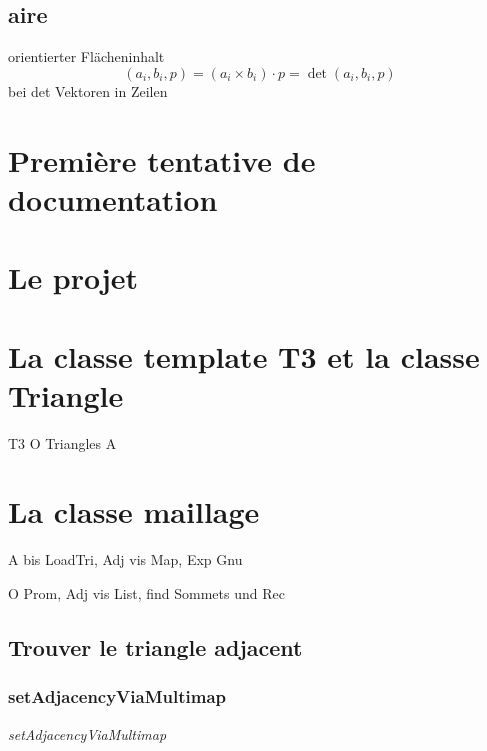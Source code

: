 \documentclass[10pt]{article}
\begin{document}
\subsection{aire}

orientierter Flächeninhalt
$$ (a_i,b_i,p) = (a_i \times b_i ) \cdot p = \det(a_i,b_i,p) $$
bei det Vektoren in Zeilen


\newpage

\section{Première tentative de documentation}

\section{Le projet}

\section{La classe template T3 et la classe Triangle}

T3 O
Triangles A

\section{La classe maillage}

A bis LoadTri, Adj vis Map, Exp Gnu

O Prom, Adj vis List, find Sommets und Rec



\subsection{Trouver le triangle adjacent}

\subsubsection{setAdjacencyViaMultimap}


\centering
 {\large \itshape{setAdjacencyViaMultimap} } 
  
\raggedright
\end{document}
